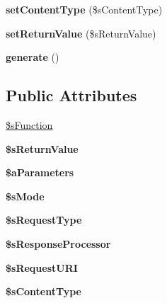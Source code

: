 \begin{DoxyCompactItemize}
\item 
\hypertarget{classxajaxCall_a70bd3d29411be48c634479fab5ced702}{
{\bfseries setContentType} (\$sContentType)}
\label{classxajaxCall_a70bd3d29411be48c634479fab5ced702}

\item 
\hypertarget{classxajaxCall_a299577ddf2256e266c1866598104b973}{
{\bfseries setReturnValue} (\$sReturnValue)}
\label{classxajaxCall_a299577ddf2256e266c1866598104b973}

\item 
\hypertarget{classxajaxCall_a35dc8102da7cdd6bb8bbc3de41cabf48}{
{\bfseries generate} ()}
\label{classxajaxCall_a35dc8102da7cdd6bb8bbc3de41cabf48}

\end{DoxyCompactItemize}
\subsection*{Public Attributes}
\begin{DoxyCompactItemize}
\item 
\hyperlink{classxajaxCall_ac3a8de12b1d810747d01510eb332c962}{\$sFunction}
\item 
\hypertarget{classxajaxCall_a0c1a7bc49bf89f2c36fc8e16d8a5f999}{
{\bfseries \$sReturnValue}}
\label{classxajaxCall_a0c1a7bc49bf89f2c36fc8e16d8a5f999}

\item 
\hypertarget{classxajaxCall_a4f8604ab16e030130903303d7f793d1c}{
{\bfseries \$aParameters}}
\label{classxajaxCall_a4f8604ab16e030130903303d7f793d1c}

\item 
\hypertarget{classxajaxCall_aea8b56b8df7825e5a042c039a9d2cbb0}{
{\bfseries \$sMode}}
\label{classxajaxCall_aea8b56b8df7825e5a042c039a9d2cbb0}

\item 
\hypertarget{classxajaxCall_a8aaaa86a7af143b4e9c91eaf63768498}{
{\bfseries \$sRequestType}}
\label{classxajaxCall_a8aaaa86a7af143b4e9c91eaf63768498}

\item 
\hypertarget{classxajaxCall_a45dbc2c586d5b2f33e563acd0f4efcdf}{
{\bfseries \$sResponseProcessor}}
\label{classxajaxCall_a45dbc2c586d5b2f33e563acd0f4efcdf}

\item 
\hypertarget{classxajaxCall_adc4c92678237116672d6df916a34bb65}{
{\bfseries \$sRequestURI}}
\label{classxajaxCall_adc4c92678237116672d6df916a34bb65}

\item 
\hypertarget{classxajaxCall_a45a4216ba31456ed27c3f15748c5f60d}{
{\bfseries \$sContentType}}
\label{classxajaxCall_a45a4216ba31456ed27c3f15748c5f60d}

\end{DoxyCompactItemize}



